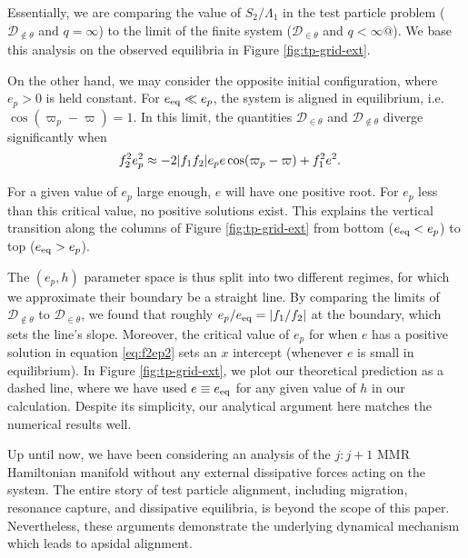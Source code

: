 \documentclass[usenatbib,twocolumn]{mnras}
\DeclarePairedDelimiter{\abs}{|}{|}
\begin{document}
Essentially, we are comparing the value of \(S_2/\Lambda_1\) in the test
particle problem ($\mathcal{D}_{\notin\theta}$ and $q=\infty$)
to the limit of the finite system
($\mathcal{D}_{\in\theta}$ and $q<\infty@$). We base this
analysis on the observed equilibria in Figure \ref{fig:tp-grid-ext}.

On the other hand, we may consider the opposite initial configuration,
where \(e_p>0\) is held constant.  For \(e_{\rm eq} \ll e_p\), the system
is aligned in equilibrium, i.e. \(\cos(\varpi_p-\varpi)=1\).  In this
limit, the quantities \(\mathcal{D}_{\in\theta}\) and
\(\mathcal{D}_{\notin\theta}\) diverge significantly when
\begin{align}
\label{eq:f2ep2}
f_2^2e_p^2 &\approx -2\abs{f_1f_2}e_p e\cos(\varpi_p-\varpi) + f_1^2e^2.
\end{align}

\noindent For a given value of \(e_p\) large enough, \(e\) will
have one positive root. For \(e_p\) less than this critical value, no
positive solutions exist.  This explains the vertical transition along
the columns of Figure \ref{fig:tp-grid-ext} from bottom (\(e_{\rm eq}<
e_p\)) to top (\(e_{\rm eq} >e_p\)).

The \((e_p,h)\) parameter space is thus split into two different
regimes, for which we approximate their boundary be a straight line.
By comparing the limits of \(\mathcal D_{\notin\theta}\) to \(\mathcal
D_{\in\theta}\), we found that roughly \(e_{p}/e_{\rm eq} = |f_1/f_2|\)
at the boundary, which sets the line's slope. Moreover, the critical
value of \(e_p\) for when \(e\) has a positive solution in equation
\eqref{eq:f2ep2} sets an \(x\) intercept (whenever \(e\) is small in
equilibrium).  In Figure \ref{fig:tp-grid-ext}, we plot our theoretical
prediction as a dashed line, where we have used \(e\equiv e_{\rm eq}\)
for any given value of \(h\) in our calculation. Despite its simplicity,
our analytical argument here matches the numerical results well.

Up until now, we have been considering an analysis of the \(j:j+1\) MMR
Hamiltonian manifold without any external dissipative forces acting on
the system. The entire story of test particle alignment, including
migration, resonance capture, and dissipative equilibria, is beyond
the scope of this paper. Nevertheless, these arguments demonstrate
the underlying dynamical mechanism which leads to apsidal alignment.
\end{document}

